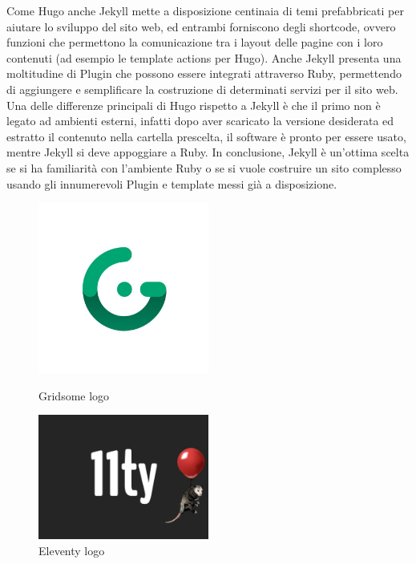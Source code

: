 \documentclass[target=bach,aauheader=]{thud}
\begin{document}
Come Hugo anche Jekyll mette a disposizione centinaia di temi prefabbricati per aiutare lo sviluppo del sito web, ed entrambi forniscono degli shortcode, ovvero funzioni che permettono la comunicazione tra i layout delle pagine con i loro contenuti (ad esempio le template actions per Hugo).
Anche Jekyll presenta una moltitudine di Plugin che possono essere integrati attraverso Ruby, permettendo di aggiungere e semplificare la costruzione di determinati servizi per il sito web. \newline
Una delle differenze principali di Hugo rispetto a Jekyll è che il primo non è legato ad ambienti esterni, infatti dopo aver scaricato la versione desiderata ed estratto il contenuto nella cartella prescelta, il software è pronto per essere usato, mentre Jekyll si deve appoggiare a Ruby.
\newline
In conclusione, Jekyll è un'ottima scelta se si ha familiarità con l'ambiente Ruby o se si vuole costruire un sito complesso usando gli innumerevoli Plugin e template messi già a disposizione. 

\begin{figure}[t]
    \begin{minipage}[t]{0.5\textwidth}
      \centering
      \includegraphics[width=0.5\textwidth]{images/Gridsome-logo.png}
      \caption{Gridsome logo}
    \end{minipage}%
    \hfill
    \begin{minipage}[t]{0.5\textwidth}
      \centering
      \includegraphics[width=0.5\textwidth]{images/Eleventy_logo.png}
      \caption{Eleventy logo}
    \end{minipage}
\end{figure}
\end{document}
